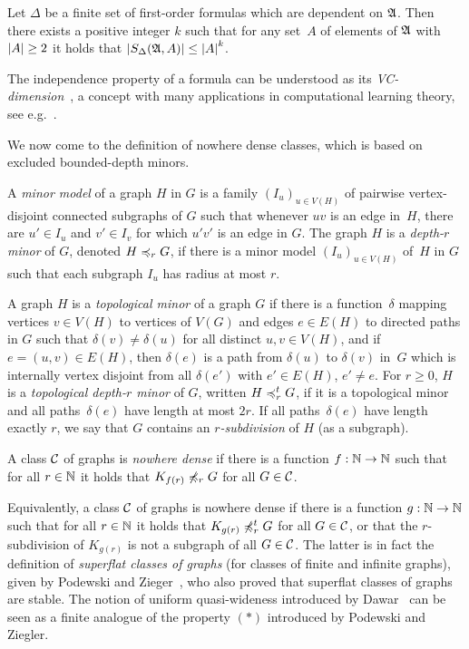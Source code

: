 \begin{theorem}
Let $\Delta$ be a finite set of first-order formulas which are 
dependent on $\mathfrak{A}$. Then there exists a positive integer $k$ such that 
for any set~$A$ of elements of $\mathfrak{A}$ with $\left\lvert A\right\rvert\geq 2$ it holds that
$\left\lvert S_\Delta(\mathfrak{A},A)\right\rvert\leq \left\lvert A\right\rvert^k$. 
\end{theorem}

The independence property of a formula can be understood as its 
\emph{VC-dimension}~\cite{vapnik2015uniform,laskowski1992vapnik}, 
a concept with many applications in computational
learning theory, see e.g.~\cite{}. 

We now come to the definition of nowhere dense classes, which is based
on excluded bounded-depth minors. 

\begin{definition}
A {\em{minor model}} of a graph $H$ in $G$ is a family $(I_u)_{u\in V(H)}$ of pairwise vertex-disjoint connected subgraphs of $G$
such that whenever $uv$ is an edge in~$H$, there are $u'\in I_u$ and $v'\in I_v$ for which $u'v'$ 
is an edge in $G$.
The graph $H$ is a {\em{depth-$r$ minor}} of $G$, denoted $H\preccurlyeq_rG$, if there is a minor model
$(I_u)_{u\in V(H)}$ of~$H$ in $G$ such that each subgraph $I_u$ has radius at most $r$.

A graph $H$ is a \emph{topological minor} of a graph $G$ if there is a
function~$\delta$ mapping vertices $v\in V(H)$ to vertices of $V(G)$ and 
edges $e\in E(H)$ to directed paths in $G$ such that 
$\delta(v)\neq \delta(u)$ for all distinct $u,v\in V(H)$, and 
if $e=(u,v)\in E(H)$, then $\delta(e)$ is a path from 
$\delta(u)$ to $\delta(v)$ in~$G$ which is internally vertex disjoint from all 
$\delta(e')$ with $e'\in E(H)$, $e'\neq e$. 
For $r\geq 0$, $H$ is a \emph{topological depth-$r$ minor} of $G$, 
written $H\preccurlyeq_r^tG$, if it is a topological minor and all paths~$\delta(e)$
have length at most $2r$. If all paths~$\delta(e)$ have length exactly
$r$, we say that $G$ contains an \emph{$r$-subdivision} of $H$ (as a 
subgraph). 
\end{definition}

\begin{definition}
A class $\mathcal{C}$ of graphs is \emph{nowhere dense} if there is a function 
$f:\mathbb{N}\rightarrow \mathbb{N}$ such that for all $r\in \mathbb{N}$ it holds that $K_{f(r)}\not\preccurlyeq_r G$
for all $G\in \mathcal{C}$. 
\end{definition}

Equivalently, a 
class $\mathcal{C}$ of graphs is nowhere dense if there is a function 
$g:\mathbb{N}\rightarrow \mathbb{N}$ such that for all $r\in \mathbb{N}$ it holds that 
$K_{g(r)}\not\preccurlyeq_r^t G$ for all $G\in \mathcal{C}$, or that the
$r$-subdivision of $K_{g(r)}$ is not a subgraph of all $G\in \mathcal{C}$. 
The latter is in fact the definition of \emph{superflat classes of graphs}
(for classes of finite and infinite graphs), 
given by Podewski and Zieger~\cite{podewski1978stable}, who also
proved that superflat classes of graphs are stable. 
The notion of uniform
quasi-wideness introduced by Dawar~\cite{dawar2010homomorphism}
can be seen as a finite analogue of the property 
$(\ast)$ introduced by Podewski and Ziegler. 

